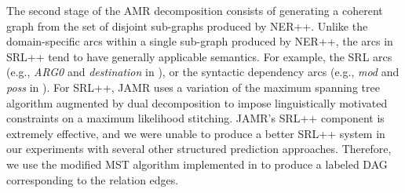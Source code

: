 \documentclass[11pt]{article}
\newcommand\e[1]{\textit{#1}} %
\begin{document}

The second stage of the AMR decomposition consists of generating a coherent graph
  from the set of disjoint sub-graphs produced by NER++.
Unlike the domain-specific arcs within a single sub-graph produced by NER++, the
  arcs in SRL++ tend to have generally applicable semantics.
For example, the SRL arcs (e.g., \e{ARG0} and \e{destination} in ),
  or the syntactic dependency arcs (e.g., \e{mod} and \e{poss} in ).
For SRL++, JAMR uses a variation of the maximum spanning tree algorithm augmented by dual decomposition to impose linguistically motivated constraints on a maximum likelihood stitching. JAMR's SRL++ component is extremely effective, and we were unable to produce a better SRL++ system in our experiments with several other structured prediction approaches.
Therefore, we use the modified MST algorithm implemented in  to produce
  a labeled DAG corresponding to the relation edges.

\end{document}

